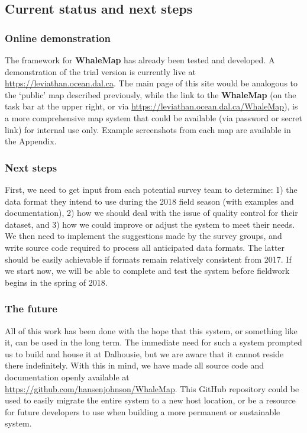 \documentclass[11pt, letterpaper]{article}
\begin{document}
\subsection{Current status and next steps}

\subsubsection{Online demonstration}

The framework for \textbf{WhaleMap} has already been tested and developed. A demonstration of the trial version is currently live at \url{https://leviathan.ocean.dal.ca}. The main page of this site would be analogous to the `public' map described previously, while the link to the \textbf{WhaleMap} (on the task bar at the upper right, or via \url{https://leviathan.ocean.dal.ca/WhaleMap}), is a more comprehensive map system that could be available (via password or secret link) for internal use only. Example screenshots from each map are available in the Appendix. 

\subsubsection{Next steps}

First, we need to get input from each potential survey team to determine: 1) the data format they intend to use during the 2018 field season (with examples and documentation), 2) how we should deal with the issue of quality control for their dataset, and 3) how we could improve or adjust the system to meet their needs. We then need to implement the suggestions made by the survey groups, and write source code required to process all anticipated data formats. The latter should be easily achievable if formats remain relatively consistent from 2017. If we start now, we will be able to complete and test the system before fieldwork begins in the spring of 2018.

\subsubsection{The future}

All of this work has been done with the hope that this system, or something like it, can be used in the long term. The immediate need for such a system prompted us to build and house it at Dalhousie, but we are aware that it cannot reside there indefinitely. With this in mind, we have made all source code and documentation openly available at \url{https://github.com/hansenjohnson/WhaleMap}. This GitHub repository could be used to easily migrate the entire system to a new host location, or be a resource for future developers to use when building a more permanent or sustainable system.
\end{document}
